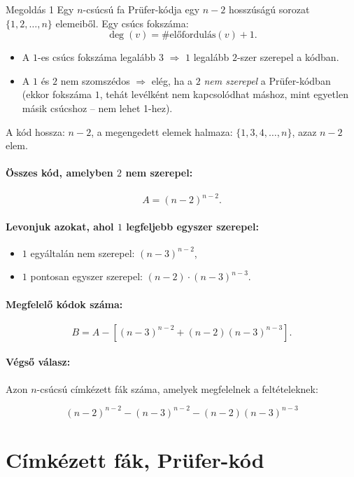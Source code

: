 \begin{solution}
Megoldás 1 Egy $n$-csúcsú fa Prüfer-kódja egy $n-2$ hosszúságú sorozat
$\{1,2,\dots,n\}$ elemeiből. Egy csúcs fokszáma: 
\[
\deg(v)=\#\text{előfordulás}(v)+1.
\]
\begin{itemize}
\item A $1$-es csúcs fokszáma legalább $3$ $\Rightarrow$ $1$ legalább
$2$-szer szerepel a kódban. 
\item A $1$ és $2$ nem szomszédos $\Rightarrow$ elég, ha a $2$ \emph{nem
szerepel} a Prüfer-kódban (ekkor fokszáma $1$, tehát levélként nem
kapcsolódhat máshoz, mint egyetlen másik csúcshoz -- nem lehet 1-hez). 
\end{itemize}
A kód hossza: $n-2$, a megengedett elemek halmaza: $\{1,3,4,\dots,n\}$,
azaz $n-2$ elem.

\paragraph{Összes kód, amelyben $2$ nem szerepel:}

\[
A=(n-2)^{n-2}.
\]

\paragraph{Levonjuk azokat, ahol $1$ legfeljebb egyszer szerepel:}
\begin{itemize}
\item $1$ egyáltalán nem szerepel: $(n-3)^{n-2}$, 
\item $1$ pontosan egyszer szerepel: $(n-2)\cdot(n-3)^{n-3}$. 
\end{itemize}

\paragraph{Megfelelő kódok száma:}

\[
B=A-\left[(n-3)^{n-2}+(n-2)(n-3)^{n-3}\right].
\]

\paragraph{Végső válasz:}

Azon $n$-csúcsú címkézett fák száma, amelyek megfelelnek a feltételeknek:

\[
\boxed{(n-2)^{n-2}-(n-3)^{n-2}-(n-2)(n-3)^{n-3}}
\]
\end{solution}

\section{Címkézett fák, Prüfer-kód}\label{sec:cimkezett_fak}

